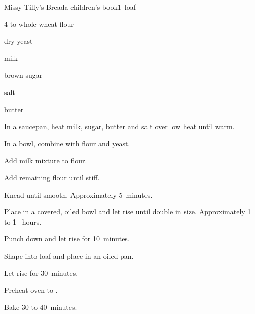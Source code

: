\begin{recipe}{Missy Tilly's Bread}{a children's book}{1~loaf}

\begin{ingredients}
\item 4 to \C{4\third} whole wheat flour
\item \tp{4\half} dry yeast
\item \C{1\threequarter} milk
\item \C{\half} brown sugar
\item {} salt
\item {} butter
\end{ingredients}

\begin{directions}
\item In a saucepan, heat milk, sugar, butter and salt over low heat until warm.
\item In a bowl, combine with  flour and yeast.
\item Add milk mixture to flour.
\item Add remaining flour until stiff.
\item Knead until smooth. Approximately 5~minutes.
\item Place in a covered, oiled bowl and let rise until double in size. Approximately 1 to 1 \half~hours.
\item Punch down and let rise for 10~minutes.
\item Shape into loaf and place in an oiled pan.
\item Let rise for 30~minutes.
\item Preheat oven to .
\item Bake 30 to 40~minutes.
\end{directions}
\end{recipe}
